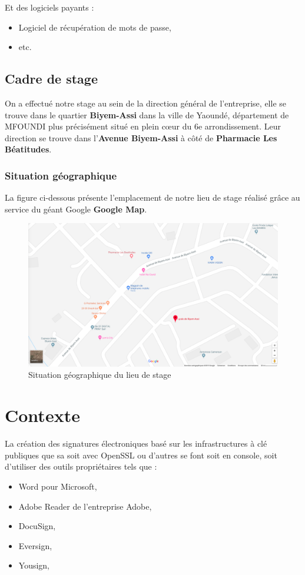 					Et des logiciels payants :
					\begin{itemize}
						\item Logiciel de récupération de mots de passe,
						\item etc.
					\end{itemize}
			
		
		\subsection{Cadre de stage}
			On a effectué notre stage au sein de la direction général de l'entreprise, elle se trouve dans le quartier \textbf{Biyem-Assi} dans la ville de Yaoundé, département de MFOUNDI plus précisément situé en plein cœur du 6e arrondissement. Leur direction se trouve dans l'\textbf{Avenue Biyem-Assi} à côté de \textbf{Pharmacie Les Béatitudes}.\\
		
			\subsubsection{Situation géographique}
			La figure ci-dessous présente l’emplacement de notre lieu de stage réalisé grâce au service du géant Google  \textbf{Google Map}.
				\begin{figure}[h]
					\centering
					\includegraphics[scale=0.3]{../imgs/cartemap}
					\caption{Situation géographique du lieu de stage}
					\label{fig1}
			\end{figure}
			
	\section{Contexte}
		La création des signatures électroniques basé sur les infrastructures à clé publiques que sa soit avec OpenSSL ou d'autres se font soit en console, soit d'utiliser des outils propriétaires tels que :
		\begin{itemize}
			\item Word pour Microsoft,
			\item Adobe Reader de l'entreprise Adobe,
			\item DocuSign,
			\item Eversign,
			\item Yousign,\\
		\end{itemize}
		
